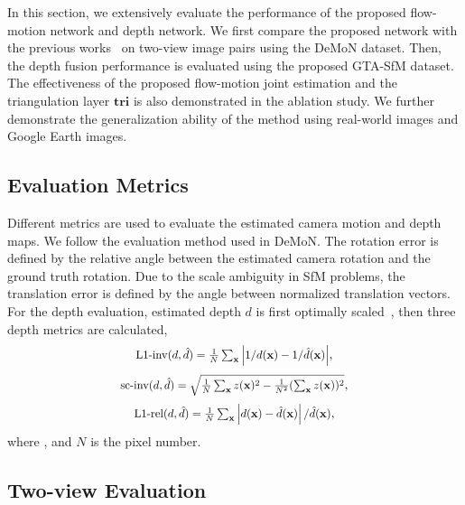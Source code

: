 \documentclass[letterpaper, 10 pt, conference]{ieeeconf}  %
\begin{document}
In this section, we extensively evaluate the performance of the proposed flow-motion network and depth network. We first compare the proposed network with the previous works~\cite{demon,ls_net,BA-Net} on two-view image pairs using the DeMoN dataset. Then, the depth fusion performance is evaluated using the proposed GTA-SfM dataset. The effectiveness of the proposed flow-motion joint estimation and the triangulation layer $\mathbf{tri}$ is also demonstrated in the ablation study. We further demonstrate the generalization ability of the method using real-world images and Google Earth images.
 
\subsection{Evaluation Metrics}
Different metrics are used to evaluate the estimated camera motion and depth maps. We follow the evaluation method used in DeMoN. The rotation error is defined by the relative angle between the estimated camera rotation and the ground truth rotation. Due to the scale ambiguity in SfM problems, the translation error is defined by the angle between normalized translation vectors. For the depth evaluation, estimated depth $d$ is first optimally scaled~\cite{demon}, then three depth metrics are calculated,
\begin{equation}
\scalebox{0.9}{$\text{L1-inv}(d,\hat{d}) = \frac{1}{N} \sum_\mathbf{x} \left| 1 / d(\mathbf{x}) - 1 / \hat{d}(\mathbf{x}) \right|$},
\end{equation}
\begin{equation}
\scalebox{0.9}{$\text{sc-inv}(d,\hat{d}) = \sqrt{\frac{1}{N}\sum_\mathbf{x}z(\mathbf{x})^2 - \frac{1}{N^2}(\sum_\mathbf{x}z(\mathbf{x}))^2}$},
\end{equation}
\begin{equation}
\scalebox{0.9}{$\text{L1-rel}(d,\hat{d}) = \frac{1}{N} \sum_\mathbf{x}  \left| d(\mathbf{x}) - \hat{d}(\mathbf{x}) \right|  / \hat{d}(\mathbf{x})$},
\end{equation}
where , and $N$ is the pixel number.

\subsection{Two-view Evaluation}
 
\end{document}
